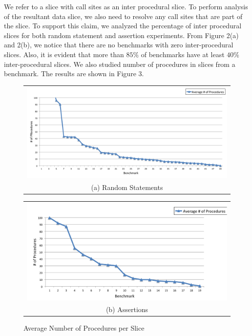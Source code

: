 \documentclass[12pt]{article}
\begin{document}
We refer to a slice with call sites as an inter procedural slice. To perform analysis of the resultant data slice, we also need to resolve any call sites that are part of the slice. To support this claim, we analyzed the percentage of inter procedural slices for both random statement and assertion experiments. From Figure 2(a) and 2(b), we notice that there are no benchmarks with zero inter-procedural slices. Also, it is evident that more than $85\%$ of benchmarks have at least $40\%$ inter-procedural slices. We also studied number of procedures in slices from a benchmark. The results are shown in Figure 3. \\

\begin{figure}[H]
  \centering
  \begin{tabular}{@{}c@{}}
    \includegraphics[width=5in]{proc-count.png} \\[\abovecaptionskip]
    \small (a) Random Statements
  \end{tabular}

  \vspace{\floatsep}

  \begin{tabular}{@{}c@{}}
    \includegraphics[width=5in]{proc-count-assert.png} \\[\abovecaptionskip]
    \small (b) Assertions
  \end{tabular}
  
  \caption{Average Number of Procedures per Slice}\label{procedure count average}
\end{figure}
\end{document}
